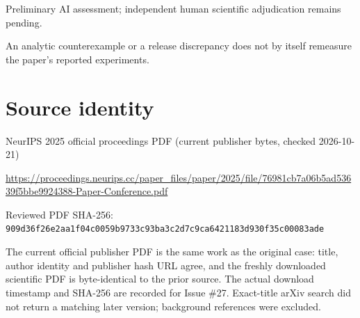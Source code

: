 \documentclass[11pt]{article}
\begin{document}
Preliminary AI assessment; independent human scientific adjudication remains pending.\par

An analytic counterexample or a release discrepancy does not by itself remeasure the paper’s reported experiments.\par

\section*{Source identity}

NeurIPS 2025 official proceedings PDF (current publisher bytes, checked 2026-10-21)

\url{https://proceedings.neurips.cc/paper_files/paper/2025/file/76981cb7a06b5ad53639f5bbe9924388-Paper-Conference.pdf}

Reviewed PDF SHA-256: \nolinkurl{909d36f26e2aa1f04c0059b9733c93ba3c2d7c9ca6421183d930f35c00083ade}

The current official publisher PDF is the same work as the original case: title, author identity and publisher hash URL agree, and the freshly downloaded scientific PDF is byte-identical to the prior source. The actual download timestamp and SHA-256 are recorded for Issue \#27. Exact-title arXiv search did not return a matching later version; background references were excluded.
\end{document}
